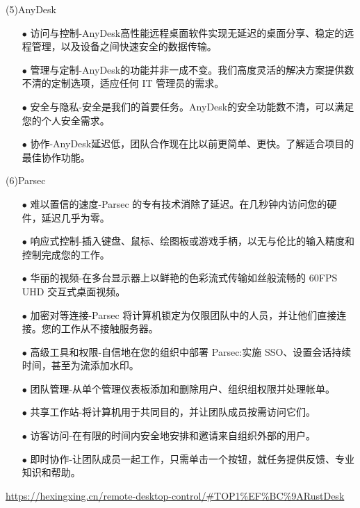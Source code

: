 \documentclass[a4paper,twoside]{scrbook}
\begin{document}
\begin{CJK}{UTF8}{gbsn}
(5)AnyDesk
\begin{itemize}
\item[$\bullet$]访问与控制-AnyDesk高性能远程桌面软件实现无延迟的桌面分享、稳定的远程管理，以及设备之间快速安全的数据传输。
\item[$\bullet$]管理与定制-AnyDesk的功能并非一成不变。我们高度灵活的解决方案提供数不清的定制选项，适应任何 IT 管理员的需求。
\item[$\bullet$]安全与隐私-安全是我们的首要任务。AnyDesk的安全功能数不清，可以满足您的个人安全需求。
\item[$\bullet$]协作-AnyDesk延迟低，团队合作现在比以前更简单、更快。了解适合项目的最佳协作功能。
\end{itemize}

(6)Parsec
\begin{itemize}
\item[$\bullet$]难以置信的速度-Parsec 的专有技术消除了延迟。在几秒钟内访问您的硬件，延迟几乎为零。
\item[$\bullet$]响应式控制-插入键盘、鼠标、绘图板或游戏手柄，以无与伦比的输入精度和控制完成您的工作。
\item[$\bullet$]华丽的视频-在多台显示器上以鲜艳的色彩流式传输如丝般流畅的 60FPS UHD 交互式桌面视频。
\item[$\bullet$]加密对等连接-Parsec 将计算机锁定为仅限团队中的人员，并让他们直接连接。您的工作从不接触服务器。
\item[$\bullet$]高级工具和权限-自信地在您的组织中部署 Parsec:实施 SSO、设置会话持续时间，甚至为流添加水印。
\item[$\bullet$]团队管理-从单个管理仪表板添加和删除用户、组织组权限并处理帐单。
\item[$\bullet$]共享工作站-将计算机用于共同目的，并让团队成员按需访问它们。
\item[$\bullet$]访客访问-在有限的时间内安全地安排和邀请来自组织外部的用户。
\item[$\bullet$]即时协作-让团队成员一起工作，只需单击一个按钮，就任务提供反馈、专业知识和帮助。
\end{itemize}

\url{https://hexingxing.cn/remote-desktop-control/#TOP1%EF%BC%9ARustDesk}

\end{CJK}
\end{document}
